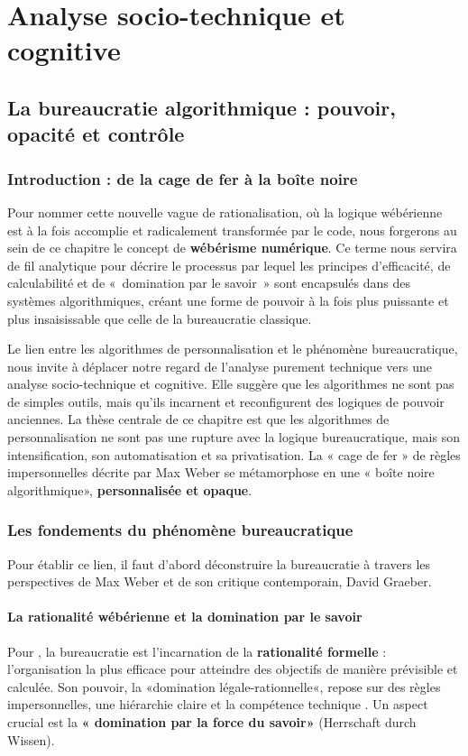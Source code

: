 \part{Analyse socio-technique et cognitive}
\chapter{La bureaucratie algorithmique : pouvoir, opacité et contrôle}
\label{chap:bureaucratie}

\section{Introduction : de la cage de fer à la boîte noire}
Pour nommer cette nouvelle vague de rationalisation, où la logique wébérienne est à la fois accomplie et radicalement transformée par le code, nous forgerons au sein de ce chapitre le concept de \textbf{wébérisme numérique}. Ce terme nous servira de fil analytique pour décrire le processus par lequel les principes d'efficacité, de calculabilité et de «~domination par le savoir~» sont encapsulés dans des systèmes algorithmiques, créant une forme de pouvoir à la fois plus puissante et plus insaisissable que celle de la bureaucratie classique.

Le lien entre les algorithmes de personnalisation et le phénomène bureaucratique, nous invite à déplacer notre regard de l'analyse purement technique vers une analyse socio-technique et cognitive. Elle suggère que les algorithmes ne sont pas de simples outils, mais qu'ils incarnent et reconfigurent des logiques de pouvoir anciennes. La thèse centrale de ce chapitre est que les algorithmes de personnalisation ne sont pas une rupture avec la logique bureaucratique, mais son intensification, son automatisation et sa privatisation. La « cage de fer » de règles impersonnelles décrite par Max Weber se métamorphose en une « boîte noire algorithmique», \textbf{personnalisée et opaque}.

\section{Les fondements du phénomène bureaucratique}

Pour établir ce lien, il faut d'abord déconstruire la bureaucratie à travers les perspectives de Max Weber et de son critique contemporain, David Graeber.

\subsection{La rationalité wébérienne et la domination par le savoir}
Pour \citet{Weber1922}, la bureaucratie est l'incarnation de la \textbf{rationalité formelle} : l'organisation la plus efficace pour atteindre des objectifs de manière prévisible et calculée. Son pouvoir, la «domination légale-rationnelle«, repose sur des règles impersonnelles, une hiérarchie claire et la compétence technique \citep{Serpa2019}. Un aspect crucial est la \textbf{« domination par la force du savoir»} (Herrschaft durch Wissen). 

